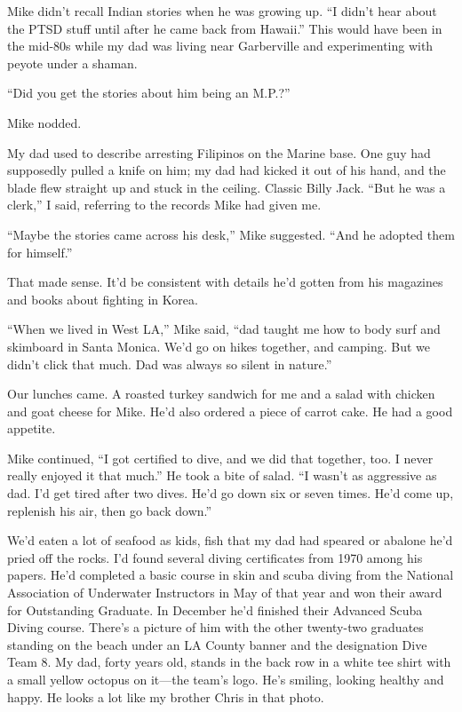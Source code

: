 \documentclass[12pt]{book}
\begin{document}
Mike didn't recall Indian stories when he was growing up. ``I didn't hear about the PTSD stuff until after he came back from Hawaii.'' This would have been in the mid-80s while my dad was living near Garberville and experimenting with peyote under a shaman.

``Did you get the stories about him being an M.P.?''

Mike nodded.

My dad used to describe arresting Filipinos on the Marine base. One guy had supposedly pulled a knife on him; my dad had kicked it out of his hand, and the blade flew straight up and stuck in the ceiling. Classic Billy Jack. ``But he was a clerk,'' I said, referring to the records Mike had given me.

``Maybe the stories came across his desk,'' Mike suggested. ``And he adopted them for himself.''

That made sense. It'd be consistent with details he'd gotten from his magazines and books about fighting in Korea.

``When we lived in West LA,'' Mike said, ``dad taught me how to body surf and skimboard in Santa Monica. We'd go on hikes together, and camping. But we didn't click that much. Dad was always so silent in nature.''

Our lunches came. A roasted turkey sandwich for me and a salad with chicken and goat cheese for Mike. He'd also ordered a piece of carrot cake. He had a good appetite.

Mike continued, ``I got certified to dive, and we did that together, too. I never really enjoyed it that much.'' He took a bite of salad. ``I wasn't as aggressive as dad. I'd get tired after two dives. He'd go down six or seven times. He'd come up, replenish his air, then go back down.''

We'd eaten a lot of seafood as kids, fish that my dad had speared or abalone he'd pried off the rocks. I'd found several diving certificates from 1970 among his papers. He'd completed a basic course in skin and scuba diving from the National Association of Underwater Instructors in May of that year and won their award for Outstanding Graduate. In December he'd finished their Advanced Scuba Diving course. There's a picture of him with the other twenty-two graduates standing on the beach under an LA County banner and the designation Dive Team 8. My dad, forty years old, stands in the back row in a white tee shirt with a small yellow octopus on it---the team's logo. He's smiling, looking healthy and happy. He looks a lot like my brother Chris in that photo.
\end{document}
